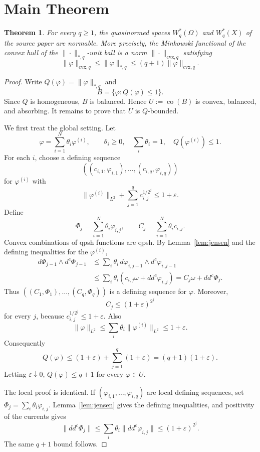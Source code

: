 \documentclass[11pt]{article}
\newtheorem{theorem}{Theorem}
\newcommand{\ddc}{dd^c}
\newcommand{\co}{\operatorname{co}}
\begin{document}
\section*{Main Theorem}

\begin{theorem}
\label{thm:normable}
For every \(q\geq1\), the quasinormed spaces \(W_q^*(\Omega)\) and
\(W_q^*(X)\) of the source paper are normable. More precisely, the Minkowski
functional of the convex hull of the \(\|\cdot\|_{*,q}\)-unit ball is a norm
\(\|\cdot\|_{\mathrm{cvx},q}\) satisfying
\[
  \|\varphi\|_{\mathrm{cvx},q}
  \leq \|\varphi\|_{*,q}
  \leq (q+1)\|\varphi\|_{\mathrm{cvx},q}.
\]
\end{theorem}

\begin{proof}
Write \(Q(\varphi)=\|\varphi\|_{*,q}\) and
\[
  B=\{\varphi:Q(\varphi)\leq1\}.
\]
Since \(Q\) is homogeneous, \(B\) is balanced. Hence \(U:=\co(B)\) is convex,
balanced, and absorbing. It remains to prove that \(U\) is \(Q\)-bounded.

We first treat the global setting. Let
\[
  \varphi=\sum_{i=1}^N\theta_i\varphi^{(i)},\qquad
  \theta_i\geq0,\quad \sum_i\theta_i=1,\quad Q(\varphi^{(i)})\leq1.
\]
For each \(i\), choose a defining sequence
\[
 ((c_{i,1},\varphi_{i,1}),\ldots,(c_{i,q},\varphi_{i,q}))
\]
for \(\varphi^{(i)}\) with
\[
  \|\varphi^{(i)}\|_{L^2}
  +\sum_{j=1}^q c_{i,j}^{1/2^j}\leq 1+\varepsilon.
\]
Define
\[
  \Phi_j=\sum_{i=1}^N\theta_i\varphi_{i,j},
  \qquad
  C_j=\sum_{i=1}^N\theta_i c_{i,j}.
\]
Convex combinations of qpsh functions are qpsh. By Lemma~\ref{lem:jensen}
and the defining inequalities for the \(\varphi^{(i)}\),
\[
\begin{aligned}
  d\Phi_{j-1}\wedge d^c\Phi_{j-1}
  &\leq \sum_i\theta_i\,
       d\varphi_{i,j-1}\wedge d^c\varphi_{i,j-1}  \\
  &\leq \sum_i\theta_i(c_{i,j}\omega+\ddc\varphi_{i,j})
   = C_j\omega+\ddc\Phi_j .
\end{aligned}
\]
Thus \(((C_1,\Phi_1),\ldots,(C_q,\Phi_q))\) is a defining sequence for
\(\varphi\). Moreover,
\[
  C_j\leq (1+\varepsilon)^{2^j}
\]
for every \(j\), because \(c_{i,j}^{1/2^j}\leq1+\varepsilon\). Also
\[
  \|\varphi\|_{L^2}\leq \sum_i\theta_i\|\varphi^{(i)}\|_{L^2}\leq1+\varepsilon.
\]
Consequently
\[
  Q(\varphi)
  \leq (1+\varepsilon)+\sum_{j=1}^q(1+\varepsilon)
  =(q+1)(1+\varepsilon).
\]
Letting \(\varepsilon\downarrow0\), \(Q(\varphi)\leq q+1\) for every
\(\varphi\in U\).

The local proof is identical. If
\((\varphi_{i,1},\ldots,\varphi_{i,q})\) are local defining sequences, set
\(\Phi_j=\sum_i\theta_i\varphi_{i,j}\). Lemma~\ref{lem:jensen} gives the
defining inequalities, and positivity of the currents gives
\[
  \|\ddc\Phi_j\|
  \leq\sum_i\theta_i\|\ddc\varphi_{i,j}\|
  \leq (1+\varepsilon)^{2^j}.
\]
The same \(q+1\) bound follows.


\end{proof}
\end{document}
